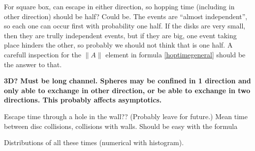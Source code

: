 \documentclass[letterpaper,10pt]{article}
\begin{document}
For square box, can escape in either direction, so hopping time (including in other direction) should be half? Could be. The events are ``almost independent'', so each one
can occur first with probability one half. If the disks are very small, then
they are trully independent events, but if they are big, one event taking
place hinders the other, so probably we should not think that is 
one half. A carefull inspection for the $\|A\|$ element in formula \ref{hoptimegeneral}
should be the answer to that.


\textbf{ 3D?  Must be long channel. Spheres may be confined in 1 direction  and only able to exchange in other direction, or be able to exchange in two directions.
This probably affects asymptotics.}

Escape time through a hole in the wall?? (Probably leave for future.)
Mean time between disc collisions, collisions with walls. Should be easy with the formula

Distributions of all these times (numerical with histogram).



\end{document}
